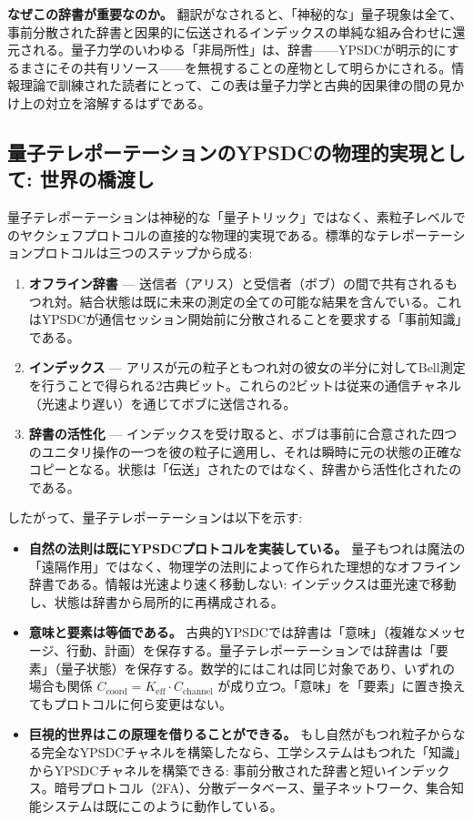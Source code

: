 \documentclass[12pt,a4paper]{article}
\theoremstyle{definition}
\theoremstyle{remark}
\begin{document}
	\noindent
	\textbf{なぜこの辞書が重要なのか。} 翻訳がなされると、「神秘的な」量子現象は全て、事前分散された辞書と因果的に伝送されるインデックスの単純な組み合わせに還元される。量子力学のいわゆる「非局所性」は、辞書——YPSDCが明示的にするまさにその共有リソース——を無視することの産物として明らかにされる。情報理論で訓練された読者にとって、この表は量子力学と古典的因果律の間の見かけ上の対立を溶解するはずである。
	
	\subsection{量子テレポーテーションのYPSDCの物理的実現として: 世界の橋渡し}
	
	量子テレポーテーションは神秘的な「量子トリック」ではなく、素粒子レベルでのヤクシェフプロトコルの直接的な物理的実現である。標準的なテレポーテーションプロトコルは三つのステップから成る:
	
	\begin{enumerate}
		\item \textbf{オフライン辞書} — 送信者（アリス）と受信者（ボブ）の間で共有されるもつれ対。結合状態は既に未来の測定の全ての可能な結果を含んでいる。これはYPSDCが通信セッション開始前に分散されることを要求する「事前知識」である。
		\item \textbf{インデックス} — アリスが元の粒子ともつれ対の彼女の半分に対してBell測定を行うことで得られる2古典ビット。これらの2ビットは従来の通信チャネル（光速より遅い）を通じてボブに送信される。
		\item \textbf{辞書の活性化} — インデックスを受け取ると、ボブは事前に合意された四つのユニタリ操作の一つを彼の粒子に適用し、それは瞬時に元の状態の正確なコピーとなる。状態は「伝送」されたのではなく、辞書から活性化されたのである。
	\end{enumerate}
	
	したがって、量子テレポーテーションは以下を示す:
	
	\begin{itemize}
		\item \textbf{自然の法則は既にYPSDCプロトコルを実装している。} 量子もつれは魔法の「遠隔作用」ではなく、物理学の法則によって作られた理想的なオフライン辞書である。情報は光速より速く移動しない: インデックスは亜光速で移動し、状態は辞書から局所的に再構成される。
		\item \textbf{意味と要素は等価である。} 古典的YPSDCでは辞書は「意味」（複雑なメッセージ、行動、計画）を保存する。量子テレポーテーションでは辞書は「要素」（量子状態）を保存する。数学的にはこれは同じ対象であり、いずれの場合も関係 $C_{\mathrm{coord}} = K_{\mathrm{eff}} \cdot C_{\mathrm{channel}}$ が成り立つ。「意味」を「要素」に置き換えてもプロトコルに何ら変更はない。
		\item \textbf{巨視的世界はこの原理を借りることができる。} もし自然がもつれ粒子からなる完全なYPSDCチャネルを構築したなら、工学システムはもつれた「知識」からYPSDCチャネルを構築できる: 事前分散された辞書と短いインデックス。暗号プロトコル（2FA）、分散データベース、量子ネットワーク、集合知能システムは既にこのように動作している。
	\end{itemize}
	
\end{document}
